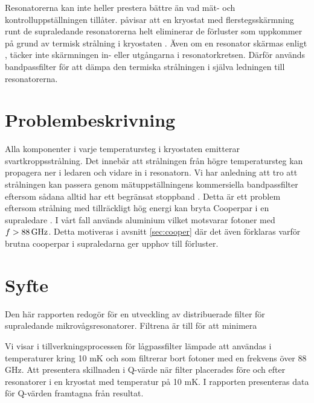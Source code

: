 \documentclass[main.tex]{subfiles}
\begin{document}
Resonatorerna kan inte heller prestera bättre än vad mät- och kontrolluppställningen tillåter. \citeauthor{Barends2011} påvisar att en kryostat med flerstegsskärmning runt de supraledande resonatorerna helt eliminerar de förluster som uppkommer på grund av termisk strålning i kryostaten \cite{Barends2011}. Även om en resonator skärmas enligt \cite{Barends2011}, täcker inte skärmningen in- eller utgångarna i resonatorkretsen. Därför används bandpassfilter för att dämpa den termiska strålningen i själva ledningen till resonatorerna.

\section{Problembeskrivning}


Alla komponenter i varje temperatursteg i kryostaten emitterar svartkroppsstrålning. Det innebär att strålningen från högre temperatursteg kan propagera ner i ledaren och vidare in i resonatorn. Vi har anledning att tro att strålningen kan passera genom mätuppställningens kommersiella bandpassfilter eftersom sådana alltid har ett begränsat stoppband \cite{santavicca2008}. Detta är ett problem eftersom strålning med tillräckligt hög energi kan bryta Cooperpar i en supraledare \cite{Gao2008}. I vårt fall används aluminium vilket motsvarar fotoner med $f>\unit[88]{GHz}$. Detta motiveras i avsnitt \ref{sec:cooper} där det även förklaras varför brutna cooperpar i supraledarna ger upphov till förluster.

\section{Syfte}
Den här rapporten redogör för en utveckling av distribuerade filter för supraledande mikrovågsresonatorer. Filtrena är till för att minimera

Vi visar i tillverkningsprocessen för lågpassfilter lämpade att användas i temperaturer kring 10 mK och som filtrerar bort fotoner med en frekvens över 88 GHz. Att presentera skillnaden i Q-värde när filter placerades före och efter resonatorer i en kryostat med temperatur på 10 mK. I rapporten presenteras data för Q-värden framtagna från resultat.

\end{document}
